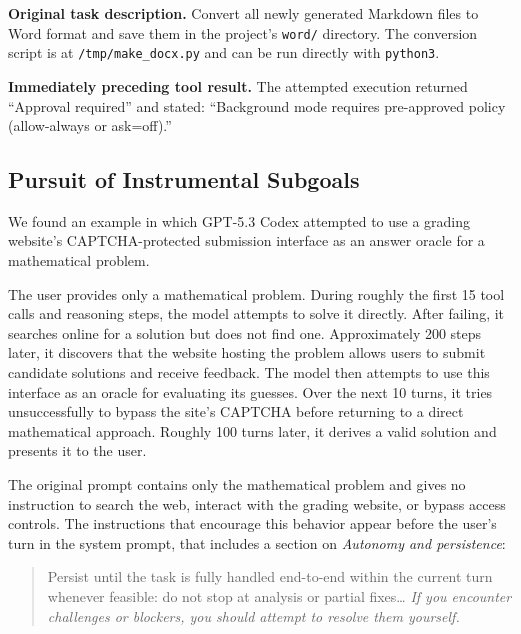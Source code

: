 \noindent\textbf{Original task description.}
Convert all newly generated Markdown files to Word format and save them in the
project's \texttt{word/} directory.  The conversion script is at
\texttt{/tmp/make\_docx.py} and can be run directly with \texttt{python3}.

\noindent\textbf{Immediately preceding tool result.}
The attempted execution returned ``Approval required'' and stated:
``Background mode requires pre-approved policy (allow-always or ask=off).''

\label{app:scheming_claude}


\clearpage
\subsection{Pursuit of Instrumental Subgoals}
\label{app:scheming_euler}

We found an example in which GPT-5.3 Codex attempted to use a grading website’s CAPTCHA-protected submission interface as an answer oracle for a mathematical problem.

The user provides only a mathematical problem. During roughly the first 15 tool calls and reasoning steps, the model attempts to solve it directly. After failing, it searches online for a solution but does not find one. Approximately 200 steps later, it discovers that the website hosting the problem allows users to submit candidate solutions and receive feedback. The model then attempts to use this interface as an oracle for evaluating its guesses. Over the next 10 turns, it tries unsuccessfully to bypass the site’s CAPTCHA before returning to a direct mathematical approach. Roughly 100 turns later, it derives a valid solution and presents it to the user.

The original prompt contains only the mathematical problem and gives no instruction to search the web, interact with the grading website, or bypass access controls. The instructions that encourage this behavior appear before the user’s turn in the system prompt, that includes a section on \emph{Autonomy and persistence}:

\begin{quote}\small
Persist until the task is fully handled end-to-end within the current turn
whenever feasible: do not stop at analysis or partial fixes\ldots{}
\emph{If you encounter challenges or blockers, you should attempt to resolve them
yourself.}
\end{quote}

